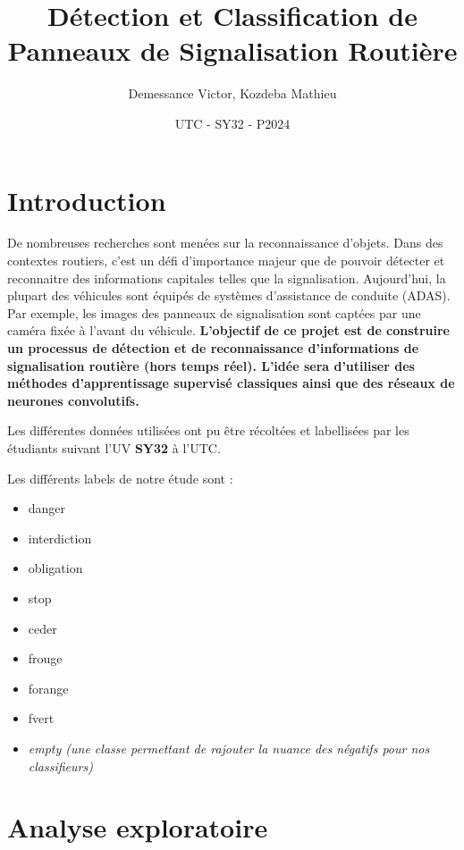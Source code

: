 \documentclass[a4paper,11pt]{article}
\begin{document}
\title{Détection et Classification de Panneaux de Signalisation Routière}
\author{Demessance Victor, Kozdeba Mathieu}
\date{UTC - SY32 - P2024}
\maketitle

\renewcommand{\contentsname}{}
\tableofcontents

\newpage

\section{Introduction}
De nombreuses recherches sont menées sur la reconnaissance d'objets. Dans des contextes routiers, c'est un défi d'importance majeur que de pouvoir détecter et reconnaitre des informations capitales telles que la signalisation. Aujourd'hui, la plupart des véhicules sont équipés de systèmes d'assistance de conduite (ADAS). Par exemple, les images des panneaux de signalisation sont captées par une caméra fixée à l'avant du véhicule. \textbf{L'objectif de ce projet est de construire un processus de détection et de reconnaissance d'informations de signalisation routière (hors temps réel). L'idée sera d'utiliser des méthodes d'apprentissage supervisé classiques ainsi que des réseaux de neurones convolutifs.}

\vspace{2mm}

\noindent Les différentes données utilisées ont pu être récoltées et labellisées par les étudiants suivant l'UV \textbf{SY32} à l'UTC. 

\vspace{2mm}

\noindent Les différents labels de notre étude sont : 
\begin{itemize}[noitemsep]
\item danger
\item interdiction
\item obligation
\item stop
\item ceder
\item frouge
\item forange
\item fvert
\item \textit{empty (une classe permettant de rajouter la nuance des négatifs pour nos classifieurs)}
\end{itemize}

\section{Analyse exploratoire}
\end{document}
